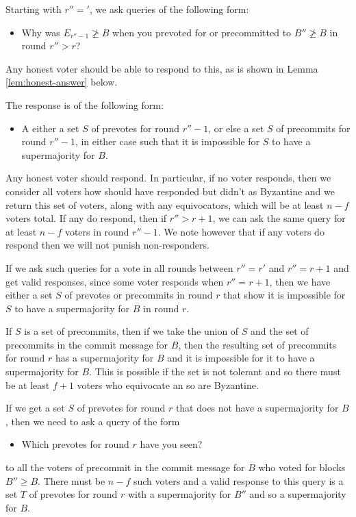 \documentclass{article}
\begin{document}
Starting with $r''='$, we ask queries of the following form: 
\begin{itemize}
\item Why was $E_{r''-1} \not\geq B$  when you prevoted for or precommitted to $B'' \not\geq B$ in round $r'' > r$?
\end{itemize}
\noindent Any honest voter should be able to respond to this, as is shown in Lemma \ref{lem:honest-answer} below. 

The response is of the following form:
\begin{itemize}
\item A either a set $S$ of prevotes for round $r''-1$, or else a set $S$ of precommits for round $r''-1$, in either case such that it is impossible for $S$ to have a supermajority for $B$.
\end{itemize}

Any honest voter should respond.  In particular, if no voter responds, then we consider all  voters how should have responded but didn't as Byzantine and we return this set of voters, along with any equivocators, which will be at least $n-f$ voters total. If any do respond, then if $r'' > r+1$, we can ask the same query for at least $n-f$ voters in round $r''-1$. We note however that if any voters do respond then we will not punish non-responders.

If we ask such queries for a vote in all rounds between $r''=r'$ and $r''=r+1$ and get valid responses, since some voter responds when $r''=r+1$, then we have either a set $S$ of prevotes or precommits in round $r$ that show it is impossible for $S$ to have a supermajority for $B$ in round $r$.

If $S$ is a set of precommits, then if we take the union of $S$ and the set of precommits in the commit message for $B$, then the resulting set of precommits for round $r$ has a supermajority for $B$ and it is impossible for it to have a supermajority for $B$. This is possible if the set is not tolerant and so there must be at least $f+1$ voters who equivocate an so are Byzantine.

If we get a set $S$ of prevotes for round $r$ that does not have a supermajority for $B$, then we need to ask a query of the form

\begin{itemize}
\item Which prevotes for round $r$ have you seen?
\end{itemize}
\noindent to all the voters of precommit in the commit message for $B$  who voted for blocks $B'' \geq B$. There must be $n-f$ such voters and a valid response to this query is a set $T$ of prevotes for round $r$ with a supermajority for $B''$ and so a supermajority for $B$.
\end{document}

